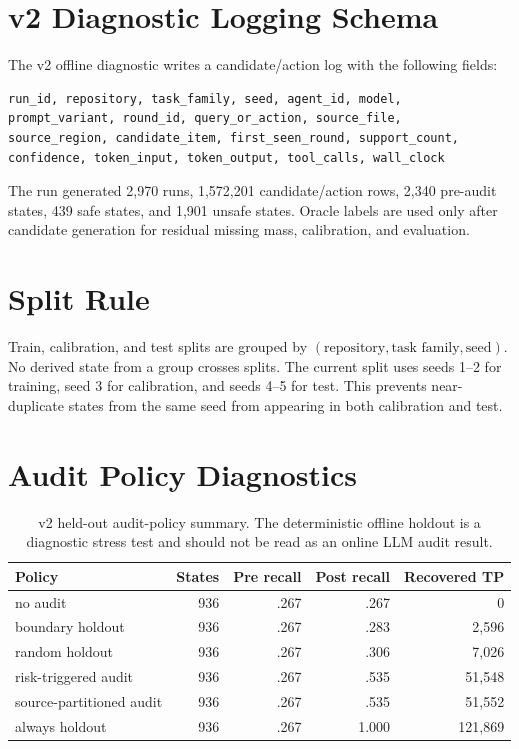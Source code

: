 \documentclass[letterpaper]{article}
\begin{document}
\section{v2 Diagnostic Logging Schema}

The v2 offline diagnostic writes a candidate/action log with the following
fields:

\begin{lstlisting}
run_id, repository, task_family, seed, agent_id, model,
prompt_variant, round_id, query_or_action, source_file,
source_region, candidate_item, first_seen_round, support_count,
confidence, token_input, token_output, tool_calls, wall_clock
\end{lstlisting}

The run generated 2,970 runs, 1,572,201 candidate/action rows, 2,340 pre-audit
states, 439 safe states, and 1,901 unsafe states. Oracle labels are used only
after candidate generation for residual missing mass, calibration, and
evaluation.

\section{Split Rule}

Train, calibration, and test splits are grouped by
$(\text{repository}, \text{task family}, \text{seed})$. No derived state from a
group crosses splits. The current split uses seeds 1--2 for training, seed 3
for calibration, and seeds 4--5 for test. This prevents near-duplicate states
from the same seed from appearing in both calibration and test.

\section{Audit Policy Diagnostics}

\begin{table}[h]
\centering
\small
\begin{tabular}{lrrrr}
\toprule
Policy & States & Pre recall & Post recall & Recovered TP \\
\midrule
no audit & 936 & .267 & .267 & 0 \\
boundary holdout & 936 & .267 & .283 & 2,596 \\
random holdout & 936 & .267 & .306 & 7,026 \\
risk-triggered audit & 936 & .267 & .535 & 51,548 \\
source-partitioned audit & 936 & .267 & .535 & 51,552 \\
always holdout & 936 & .267 & 1.000 & 121,869 \\
\bottomrule
\end{tabular}
\caption{v2 held-out audit-policy summary. The deterministic offline holdout is
a diagnostic stress test and should not be read as an online LLM audit result.}
\end{table}
\end{document}
